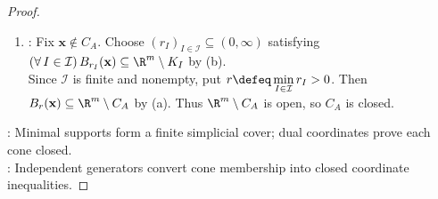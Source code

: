 \begin{lemma}
\begin{proof}
\begin{enumerate}[label=(\roman*)]
\begin{enumerate}[label=(\alph*)]
Hence $\innerprod{\mathbf{y},\mathbf{d}_j}\leq\innerprod{\mathbf{x},\mathbf{d}_j}+\abs{\innerprod{\mathbf{y}-\mathbf{x},\mathbf{d}_j}}<\frac{1}{2}\innerprod{\mathbf{x},\mathbf{d}_j}<0$, so $\mathbf{y}\notin K_I$. Thus $\R^m\setminus K_I$ is open, and $K_I$ is closed.
\item {}: Fix $\mathbf{x}\notin C_A$. Choose $(r_I)_{I\in\mathcal{I}}\subseteq(0,\infty)$ satisfying $(\forall\,I\in\mathcal{I})\,B_{r_I}(\mathbf{x})\subseteq\R^m\setminus K_I$ by (b).\\
Since $\mathcal{I}$ is finite and nonempty, put $r\defeq\min\limits_{I\in\mathcal{I}}r_I>0$. Then $B_r(\mathbf{x})\subseteq\R^m\setminus C_A$ by (a). Thus $\R^m\setminus C_A$ is open, so $C_A$ is closed.
\end{enumerate}
\end{enumerate}
: Minimal supports form a finite simplicial cover; dual coordinates prove each cone closed.\\
: Independent generators convert cone membership into closed coordinate inequalities.
\end{proof}
\end{lemma}

